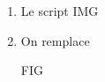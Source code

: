 \begin{enumerate}[label=\alph*)]
  \item Le script
  IMG
  
  \item On remplace
  
  FIG
\end{enumerate}